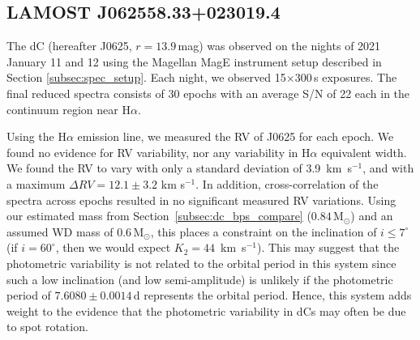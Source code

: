 \documentclass[twocolumn]{aastex631}
\begin{document}



\subsection{LAMOST J062558.33+023019.4}\label{subsec:J0625}
The dC  (hereafter J0625, $r=13.9$\,mag) was observed on the nights of 2021 January 11 and 12 using the Magellan MagE instrument setup described in Section \ref{subsec:spec_setup}. Each night, we observed 15$\times$300\,s exposures. The final reduced spectra consists of 30 epochs with an average S/N of 22 each in the continuum region near H$\alpha$. 

Using the H$\alpha$ emission line, we measured the RV of J0625 for each epoch. We found no evidence for RV variability, nor any variability in H$\alpha$ equivalent width. We found the RV to vary with only a standard deviation of 3.9~km~s$^{-1}$, and with a maximum $\Delta RV=12.1\pm3.2$ km s$^{-1}$. In addition, cross-correlation of the spectra across epochs resulted in no significant measured RV variations. Using our estimated mass from Section~\ref{subsec:dc_bps_compare} ($0.84$\,M$_{\odot}$) and an assumed WD mass of $0.6$\,M$_{\odot}$, this places a constraint on the inclination of $i \leq 7^\circ$ (if $i = 60^\circ$, then we would expect $K_2 = 44$~km~s$^{-1}$). This may suggest that the photometric variability is not related to the orbital period in this system since such a low inclination (and low semi-amplitude) is unlikely if the photometric period of $7.6080\pm0.0014$\,d represents the orbital period. Hence, this system adds weight to the evidence that the photometric variability in dCs may often be due to spot rotation.

\end{document}
